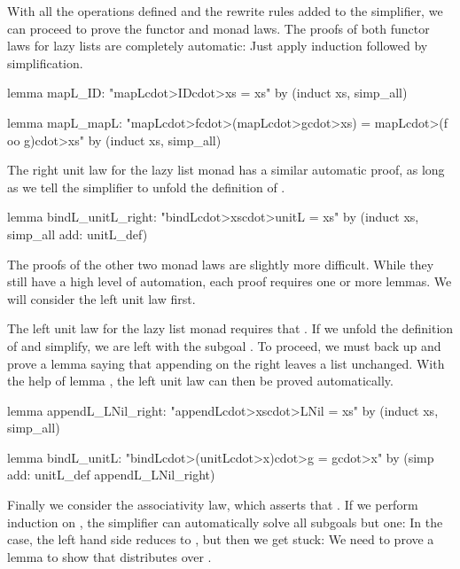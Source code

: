 With all the operations defined and the rewrite rules added to the simplifier, we can proceed to prove the functor and monad laws. The proofs of both functor laws for lazy lists are completely automatic: Just apply induction followed by simplification.
%
\begin{isacode}
lemma mapL_ID: "mapL\<cdot>ID\<cdot>xs = xs"
  by (induct xs, simp_all)
\end{isacode}
\unmedskip
{}
\begin{isacode}
lemma mapL_mapL: "mapL\<cdot>f\<cdot>(mapL\<cdot>g\<cdot>xs) = mapL\<cdot>(f oo g)\<cdot>xs"
  by (induct xs, simp_all)
\end{isacode}
%
The right unit law for the lazy list monad has a similar automatic proof, as long as we tell the simplifier to unfold the definition of .

\begin{isacode}
lemma bindL_unitL_right: "bindL\<cdot>xs\<cdot>unitL = xs"
  by (induct xs, simp_all add: unitL_def)
\end{isacode}

The proofs of the other two monad laws are slightly more difficult. While they still have a high level of automation, each proof requires one or more lemmas. We will consider the left unit law first.

The left unit law for the lazy list monad requires that . If we unfold the definition of  and simplify, we are left with the subgoal . To proceed, we must back up and prove a lemma saying that appending  on the right leaves a list unchanged. With the help of lemma , the left unit law can then be proved automatically.
\begin{isacode}
lemma appendL_LNil_right: "appendL\<cdot>xs\<cdot>LNil = xs"
  by (induct xs, simp_all)
\end{isacode}
\unmedskip
{}
\begin{isacode}
lemma bindL_unitL: "bindL\<cdot>(unitL\<cdot>x)\<cdot>g = g\<cdot>x"
  by (simp add: unitL_def appendL_LNil_right)
\end{isacode}

Finally we consider the associativity law, which asserts that  \isa{=} . If we perform induction on , the simplifier can automatically solve all subgoals but one: In the  case, the left hand side  reduces to 
, but then we get stuck: We need to prove a lemma to show that  distributes over .


